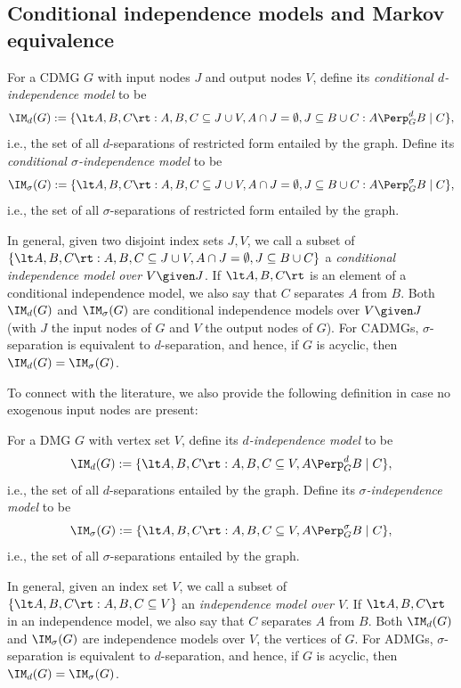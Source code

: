 \subsection{Conditional independence models and Markov equivalence}

\begin{Def}\label{def:independence_model}
  For a CDMG $G$ with input nodes $J$ and output nodes $V$, define its \emph{conditional $d$-independence model} to be
  $$\IM_d(G) := \{ \lt A, B, C \rt : A, B, C \subseteq J \cup V, A \cap J = \emptyset, J \subseteq B \cup C : A \Perp_G^d B \mid C \},$$
  i.e., the set of all $d$-separations of restricted form entailed by the graph. Define its
  \emph{conditional $\sigma$-independence model} to be
  $$\IM_\sigma(G) := \{ \lt A, B, C \rt : A, B, C \subseteq J \cup V, A \cap J = \emptyset, J \subseteq B \cup C : A \Perp_G^\sigma B \mid C \},$$
  i.e., the set of all $\sigma$-separations of restricted form entailed by the graph. 
\end{Def}
In general, given two disjoint index sets $J,V$, we call a subset of 
$\{ \lt A, B, C \rt : A, B, C \subseteq J \cup V, A \cap J = \emptyset, J \subseteq B \cup C  \}$
a \emph{conditional independence model over $V \given J$}.
If $\lt A, B, C \rt$ is an element of a conditional independence model, we also say that $C$ separates $A$ from $B$.
Both $\IM_d(G)$ and $\IM_\sigma(G)$ are conditional independence models over $V \given J$ (with
$J$ the input nodes of $G$ and $V$ the output nodes of $G$).
For CADMGs, $\sigma$-separation is equivalent to $d$-separation, and hence, if $G$ is acyclic, then
$\IM_d(G) = \IM_\sigma(G)$.

To connect with the literature, we also provide the following definition in case no exogenous input nodes are present:
\begin{Def}\label{def:independence_model}
  For a DMG $G$ with vertex set $V$, define its \emph{$d$-independence model} to be
  $$\IM_d(G) := \{ \lt A, B, C \rt : A, B, C \subseteq V, A \Perp_G^d B \mid C \},$$
  i.e., the set of all $d$-separations entailed by the graph. Define its
  \emph{$\sigma$-independence model} to be
  $$\IM_\sigma(G) := \{ \lt A, B, C \rt : A, B, C \subseteq V, A \Perp_G^\sigma B \mid C \},$$
  i.e., the set of all $\sigma$-separations entailed by the graph. 
\end{Def}
In general, given an index set $V$, we call a subset of 
$\{ \lt A, B, C \rt : A, B, C \subseteq V \}$
an \emph{independence model over $V$}.
If $\lt A, B, C \rt$ in an independence model, we also say that $C$ separates $A$ from $B$.
Both $\IM_d(G)$ and $\IM_\sigma(G)$ are independence models over $V$, the vertices of $G$.
For ADMGs, $\sigma$-separation is equivalent to $d$-separation, and hence, if $G$ is acyclic, then
$\IM_d(G) = \IM_\sigma(G)$.

